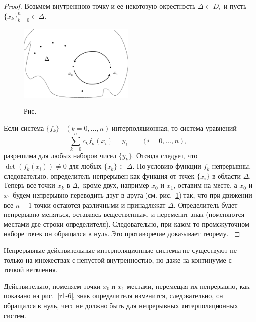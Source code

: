 \begin{proof}
Возьмем внутреннюю точку и ее некоторую
окрестность $\Delta \subset D,$
и пусть {$\{x_k\}_{k=0}^n \subset \Delta.$}


\begin{figure}[ht]
\begin{center}
\includegraphics[width=0.5\textwidth]{pict01-5.eps}
\end{center}
 \bigskip
 \label{r1-5}

 \centerline{Рис.~\theris}
 \bigskip
\end{figure}




\noindent Если система {$\{f_k\}$~ $(k=0,\ldots,n)$} интерполяционная, то система
уравнений
\[
  \sum\limits^{n}_{k=0}c_k f_k(x_i)=y_i\qquad ({i}=0,\dots ,n),
\]
разрешима для любых {наборов чисел $\{y_k\}$}. {Отсюда следует, что} $\det
(f_k(x_i)) \ne 0$ {для любых $\{x_k\} \subset \Delta$.} По условию функции
$f_k$ непрерывны, следовательно, определитель непрерывен как функция от точек
$\{x_i\}$ в области $\Delta.$ Теперь все точки $x_k$ в $\Delta,$ кроме двух, например
$x_0$ и $x_1$, оставим на месте, а $x_0$ и $x_1$ будем непрерывно переводить друг в
друга {(см. рис.~\ref{r1-5})} {так, что при движении все $n+1$ точки
остаются различными и принадлежат $\Delta$.} Определитель будет непрерывно меняться,
{оставаясь вещественным,} и переменит знак (поменяются местами две строки
определителя). Следовательно, { при каком-то} {промежуточном наборе точек он
обращался в нуль. Это противоречие доказывает } {теорему. }
\end{proof}

\begin{Remark}
Непрерывные действительные интерполяционные
системы не существуют не только на множествах с непустой
внутренностью, но даже на континууме
с точкой ветвления.
\end{Remark}
Действительно, поменяем точки $x_0$ и $x_1$ {местами, перемещая их непрерывно,} как
показано на рис.~\ref{r1-6}, знак определителя изменится, следовательно, он обращался в
нуль, чего  не {должно} быть для непрерывных интерполяционных систем.

